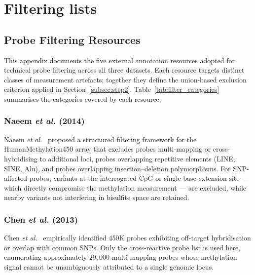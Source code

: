 \chapter{Filtering lists}
\label{sec:probe-filters}

\section{Probe Filtering Resources}
\label{app:probe_filters}

This appendix documents the five external annotation resources adopted for
technical probe filtering across all three datasets. Each resource targets
distinct classes of measurement artefacts; together they define the union-based
exclusion criterion applied in Section~\ref{subsec:step2}.
Table~\ref{tab:filter_categories} summarises the categories covered by each
resource.

\subsection{Naeem \textit{et al.} (2014)}
\label{app:naeem2014}

Naeem \textit{et al.}~\cite{naeem2014} proposed a structured filtering framework
for the HumanMethylation450 array that excludes probes multi-mapping or
cross-hybridising to additional loci, probes overlapping repetitive elements
(LINE, SINE, Alu), and probes overlapping insertion--deletion polymorphisms.
For SNP-affected probes, variants at the interrogated CpG or single-base
extension site — which directly compromise the methylation measurement — are
excluded, while nearby variants not interfering in bisulfite space are retained.

\subsection{Chen \textit{et al.} (2013)}
\label{app:chen2013}

Chen \textit{et al.}~\cite{chen2013} empirically identified 450K probes
exhibiting off-target hybridisation or overlap with common SNPs. Only the
cross-reactive probe list is used here, enumerating approximately $29{,}000$
multi-mapping probes whose methylation signal cannot be unambiguously attributed
to a single genomic locus.

